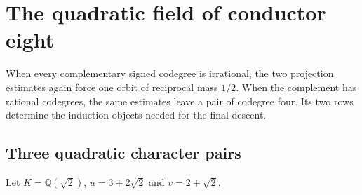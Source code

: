 \documentclass[11pt,reqno]{amsart}
\theoremstyle{remark}\newtheorem{remark}[theorem]{Remark}
\numberwithin{equation}{section}
\begin{document}
\section{The quadratic field of conductor eight}
\label{sec:quadratic-eight-cases}
When every complementary signed codegree is irrational, the two
projection estimates again force one orbit of reciprocal mass $1/2$.
When the complement has rational codegrees, the same estimates
leave a pair of codegree four. Its two rows determine the induction
objects needed for the final descent.

\subsection{Three quadratic character pairs}

Let $K=\mathbb Q(\sqrt2)$, $u=3+2\sqrt2$ and $v=2+\sqrt2$.
\end{document}
